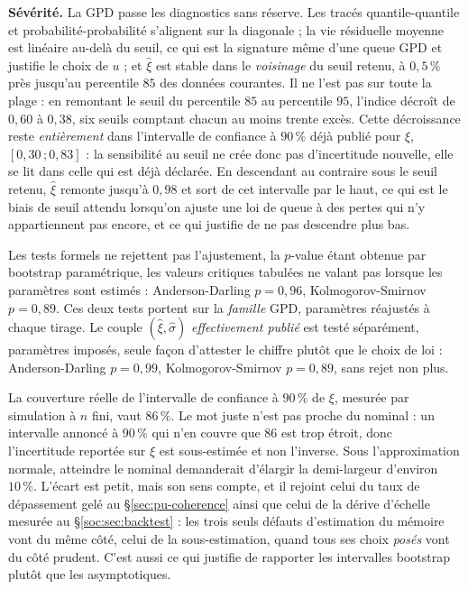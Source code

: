 \textbf{Sévérité.} La GPD passe les diagnostics sans réserve. Les tracés quantile-quantile et
probabilité-probabilité s'alignent sur la diagonale ; la vie résiduelle moyenne est linéaire
au-delà du seuil, ce qui est la signature même d'une queue GPD et justifie le choix de $u$ ;
et $\hat\xi$ est stable dans le \emph{voisinage} du seuil retenu, à $0{,}5\,\%$ près jusqu'au
percentile $85$ des données courantes. Il ne l'est pas sur toute la plage :
en remontant le seuil du percentile $85$ au percentile $95$, l'indice décroît de $0{,}60$ à
$0{,}38$, six seuils comptant chacun au moins trente excès. Cette décroissance reste
\emph{entièrement} dans l'intervalle de confiance à $90\,\%$ déjà publié pour $\xi$,
$[0{,}30\,;0{,}83]$ : la sensibilité au seuil ne crée donc pas d'incertitude nouvelle, elle se
lit dans celle qui est déjà déclarée. En descendant au contraire sous le seuil retenu, $\hat\xi$
remonte jusqu'à $0{,}98$ et sort de cet intervalle par le haut, ce qui est le biais de seuil
attendu lorsqu'on ajuste une loi de queue à des pertes qui n'y appartiennent pas encore, et ce
qui justifie de ne pas descendre plus bas.

Les tests formels ne rejettent pas l'ajustement, la $p$-value étant obtenue par bootstrap
paramétrique, les valeurs critiques tabulées ne valant pas lorsque les paramètres sont estimés :
Anderson-Darling $p=0{,}96$, Kolmogorov-Smirnov $p=0{,}89$. Ces deux tests portent sur la
\emph{famille} GPD, paramètres réajustés à chaque tirage. Le couple
$(\hat\xi,\hat\sigma)$ \emph{effectivement publié} est testé séparément, paramètres imposés,
seule façon d'attester le chiffre plutôt que le choix de loi : Anderson-Darling $p=0{,}99$,
Kolmogorov-Smirnov $p=0{,}89$, sans rejet non plus.

La couverture réelle
de l'intervalle de confiance à $90\,\%$ de $\xi$, mesurée par simulation à $n$ fini, vaut
$86\,\%$. Le mot juste n'est pas \og{}proche du nominal\fg{} : un intervalle annoncé à
$90\,\%$ qui n'en couvre que $86$ est trop étroit, donc l'incertitude reportée sur
$\xi$ est sous-estimée et non l'inverse. Sous l'approximation normale, atteindre le nominal
demanderait d'élargir la demi-largeur d'environ $10\,\%$. L'écart est petit, mais son sens
compte, et il rejoint celui du taux de dépassement gelé au \S\ref{sec:pu-coherence} ainsi que
celui de la dérive d'échelle mesurée au \S\ref{soc:sec:backtest} : les trois seuls défauts
d'estimation du mémoire vont du même côté, celui de la sous-estimation, quand tous ses choix
\emph{posés} vont du côté prudent. C'est aussi ce qui justifie de rapporter les
intervalles bootstrap plutôt que les asymptotiques.

